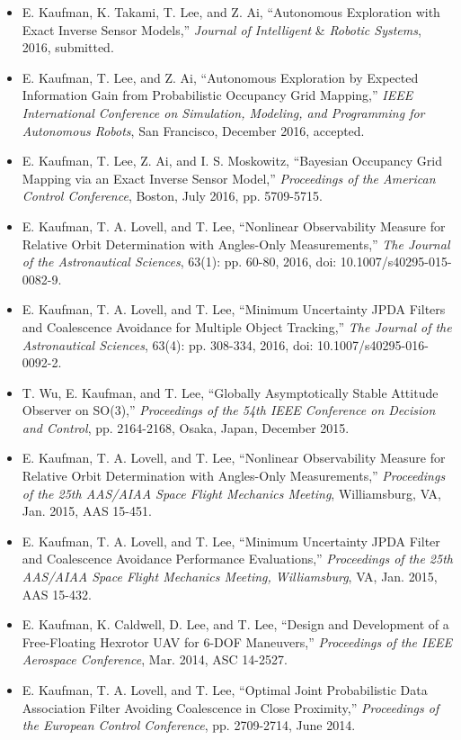 \documentclass[thesis]{thesis-gwu}
\begin{document}
\begin{itemize}
	\item E. Kaufman, K. Takami, T. Lee, and Z. Ai, ``Autonomous Exploration with Exact Inverse Sensor Models,'' \textit{Journal of Intelligent }\&\textit{ Robotic Systems}, 2016, submitted.
	\item E. Kaufman, T. Lee, and Z. Ai, ``Autonomous Exploration by Expected Information Gain from Probabilistic Occupancy Grid Mapping,'' \textit{IEEE International Conference on Simulation, Modeling, and Programming for Autonomous Robots}, San Francisco, December 2016, accepted.
	\item E. Kaufman, T. Lee, Z. Ai, and I. S. Moskowitz, ``Bayesian Occupancy Grid Mapping via an Exact Inverse Sensor Model,'' \textit{Proceedings of the American Control Conference}, Boston, July 2016, pp. 5709-5715.
	\item E. Kaufman, T. A. Lovell, and T. Lee, ``Nonlinear Observability Measure for Relative Orbit Determination with Angles-Only Measurements,'' \textit{The Journal of the Astronautical Sciences}, 63(1): pp. 60-80, 2016, doi: 10.1007/s40295-015-0082-9.
	\item E. Kaufman, T. A. Lovell, and T. Lee, ``Minimum Uncertainty JPDA Filters and Coalescence Avoidance for Multiple Object Tracking,'' \textit{The Journal of the Astronautical Sciences}, 63(4): pp. 308-334, 2016, doi: 10.1007/s40295-016-0092-2.
	\item T. Wu, E. Kaufman, and T. Lee, ``Globally Asymptotically Stable Attitude Observer on SO(3),'' \textit{Proceedings of the 54th IEEE Conference on Decision and Control}, pp. 2164-2168, Osaka, Japan, December 2015.
	\item E. Kaufman, T. A. Lovell, and T. Lee, ``Nonlinear Observability Measure for Relative Orbit Determination with Angles-Only Measurements,'' \textit{Proceedings of the 25th AAS/AIAA Space Flight Mechanics Meeting}, Williamsburg, VA, Jan. 2015, AAS 15-451.
	\item E. Kaufman, T. A. Lovell, and T. Lee, ``Minimum Uncertainty JPDA Filter and Coalescence Avoidance Performance Evaluations,'' \textit{Proceedings of the 25th AAS/AIAA Space Flight Mechanics Meeting, Williamsburg}, VA, Jan. 2015, AAS 15-432.
	\item E. Kaufman, K. Caldwell, D. Lee, and T. Lee, ``Design and Development of a Free-Floating Hexrotor UAV for 6-DOF Maneuvers,'' \textit{Proceedings of the IEEE Aerospace Conference}, Mar. 2014, ASC 14-2527.
	\item E. Kaufman, T. A. Lovell, and T. Lee, ``Optimal Joint Probabilistic Data Association Filter Avoiding Coalescence in Close Proximity,'' \textit{Proceedings of the European Control Conference}, pp. 2709-2714, June 2014.
	\vspace*{0.5cm}
\end{itemize}














\end{document}
